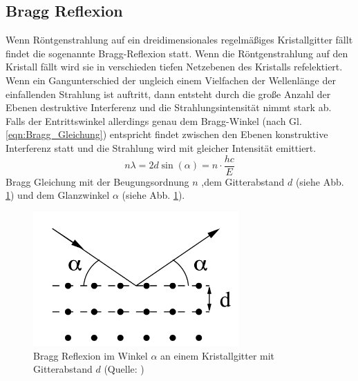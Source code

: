 \subsection{Bragg Reflexion}
Wenn Röntgenstrahlung auf ein dreidimensionales regelmäßiges Kristallgitter fällt findet die sogenannte Bragg-Reflexion statt.
Wenn die Röntgenstrahlung auf den Kristall fällt wird sie in verschieden tiefen Netzebenen des Kristalls refelektiert. Wenn ein Gangunterschied der ungleich einem Vielfachen der Wellenlänge der einfallenden Strahlung ist auftritt, dann entsteht durch die große Anzahl der Ebenen destruktive Interferenz und die Strahlungsintensität nimmt stark ab.
Falls der Entrittswinkel allerdings genau dem Bragg-Winkel (nach Gl. \ref{eqn:Bragg_Gleichung}) entspricht findet zwischen den Ebenen konstruktive Interferenz statt und die Strahlung wird mit gleicher Intensität emittiert.
\begin{equation}
    n\lambda = 2 d \sin(\alpha) = n\cdot \frac{hc}{E} \label{eqn:Bragg_Gleichung}
\end{equation}
Bragg Gleichung mit der Beugungsordnung $n$ ,dem Gitterabstand $d$ (siehe Abb. \ref{fig:Bragg_Reflexion}) und dem Glanzwinkel $\alpha$ (siehe Abb. \ref{fig:Bragg_Reflexion}).
\begin{figure}
    \centering
    \includegraphics[width=0.7\textwidth]{bilder/Bragg_Reflexion.png}
    \caption{Bragg Reflexion im Winkel $\alpha$ an einem Kristallgitter mit Gitterabstand $d$ (Quelle: \cite{Anleitung}) }
    \label{fig:Bragg_Reflexion}
\end{figure}

